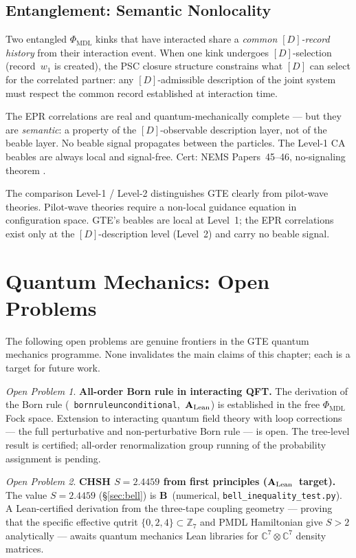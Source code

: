 \documentclass[11pt,openany]{book}
\theoremstyle{remark}
\newtheorem{openprob}{Open Problem}[chapter]
\newcommand{\MDL}{\text{MDL}}
\newcommand{\lean}[1]{%
  \penalty-100
  \begingroup\def\_{\textunderscore\allowbreak}\texttt{#1}\endgroup}
\newcommand{\CatAL}{\ensuremath{\textbf{A}_{\rm Lean}}}
\newcommand{\CatB}{\textbf{B}}
\begin{document}
\subsection*{Entanglement: Semantic Nonlocality}

Two entangled $\Phi_{\MDL}$ kinks that have interacted share a \emph{common
$[D]$-record history} from their interaction event.  When one kink undergoes
$[D]$-selection (record~$w_1$ is created), the PSC closure structure constrains what
$[D]$ can select for the correlated partner: any $[D]$-admissible description of the
joint system must respect the common record established at interaction time.

The EPR correlations are real and quantum-mechanically complete --- but they are
\emph{semantic}: a property of the $[D]$-observable description layer, not of the beable
layer.  No beable signal propagates between the particles.  The Level-1 CA beables
are always local and signal-free.  Cert: NEMS Papers~45--46, no-signaling theorem
\cite{SpivackNEMSHub}.

The comparison Level-1 / Level-2 distinguishes GTE clearly from pilot-wave
theories.  Pilot-wave theories require a non-local guidance equation in configuration
space.  GTE's beables are local at Level~1; the EPR correlations exist only at the
$[D]$-description level (Level~2) and carry no beable signal.

\section{Quantum Mechanics: Open Problems}
\label{sec:qm_open}

The following open problems are genuine frontiers in the GTE quantum mechanics programme.
None invalidates the main claims of this chapter; each is a target for future work.

\begin{openprob}
\textbf{All-order Born rule in interacting QFT.}
The derivation of the Born rule \mbox{(\lean{born\_rule\_unconditional}, \CatAL)} is established
in the free $\Phi_{\MDL}$ Fock space.  Extension to interacting quantum field theory
with loop corrections --- the full perturbative and non-perturbative Born rule --- is
open.  The tree-level result is certified; all-order renormalization group running
of the probability assignment is pending.
\end{openprob}

\begin{openprob}
\textbf{CHSH $S = 2.4459$ from first principles (\CatAL\ target).}
The value $S = 2.4459$ (§\ref{sec:bell}) is \CatB\ (numerical, \texttt{bell\_inequality\_test.py}).
A Lean-certified derivation from the three-tape coupling geometry --- proving that the
specific effective qutrit $\{0,2,4\} \subset \mathbb{Z}_7$ and PMDL Hamiltonian give
$S > 2$ analytically --- awaits quantum mechanics Lean libraries for $\mathbb{C}^7 \otimes
\mathbb{C}^7$ density matrices.
\end{openprob}
\end{document}
